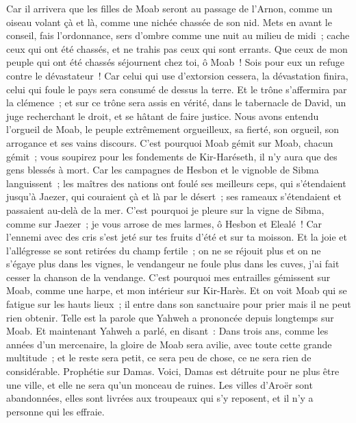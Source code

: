 \begin{multicols}{2}
Car il arrivera que les filles de Moab seront au passage de l'Arnon, comme un oiseau volant çà et là, comme une nichée chassée de son nid.
Mets en avant le conseil, fais l'ordonnance, sers d'ombre comme une nuit au milieu de midi~; cache ceux qui ont été chassés, et ne trahis pas ceux qui sont errants.
Que ceux de mon peuple qui ont été chassés séjournent chez toi, ô Moab~! Sois pour eux un refuge contre le dévastateur~! Car celui qui use d'extorsion cessera, la dévastation finira, celui qui foule le pays sera consumé de dessus la terre.
Et le trône s'affermira par la clémence~; et sur ce trône sera assis en vérité, dans le tabernacle de David, un juge recherchant le droit, et se hâtant de faire justice.
Nous avons entendu l'orgueil de Moab, le peuple extrêmement orgueilleux, sa fierté, son orgueil, son arrogance et ses vains discours.
C'est pourquoi Moab gémit sur Moab, chacun gémit~; vous soupirez pour les fondements de Kir-Haréseth, il n'y aura que des gens blessés à mort.
Car les campagnes de Hesbon et le vignoble de Sibma languissent~; les maîtres des nations ont foulé ses meilleurs ceps, qui s'étendaient jusqu'à Jaezer, qui couraient çà et là par le désert~; ses rameaux s'étendaient et passaient au-delà de la mer.
C'est pourquoi je pleure sur la vigne de Sibma, comme sur Jaezer~; je vous arrose de mes larmes, ô Hesbon et Elealé~! Car l'ennemi avec des cris s'est jeté sur tes fruits d'été et sur ta moisson.
Et la joie et l'allégresse se sont retirées du champ fertile~; on ne se réjouit plus et on ne s'égaye plus dans les vignes, le vendangeur ne foule plus dans les cuves, j'ai fait cesser la chanson de la vendange.
C'est pourquoi mes entrailles gémissent sur Moab, comme une harpe, et mon intérieur sur Kir-Harès.
Et on voit Moab qui se fatigue sur les hauts lieux~; il entre dans son sanctuaire pour prier mais il ne peut rien obtenir.
Telle est la parole que Yahweh a prononcée depuis longtemps sur Moab.
Et maintenant Yahweh a parlé, en disant~: Dans trois ans, comme les années d'un mercenaire, la gloire de Moab sera avilie, avec toute cette grande multitude~; et le reste sera petit, ce sera peu de chose, ce ne sera rien de considérable.
\VerseOne{}Prophétie sur Damas. Voici, Damas est détruite pour ne plus être une ville, et elle ne sera qu'un monceau de ruines.
Les villes d'Aroër sont abandonnées, elles sont livrées aux troupeaux qui s'y reposent, et il n'y a personne qui les effraie.

\end{multicols}
